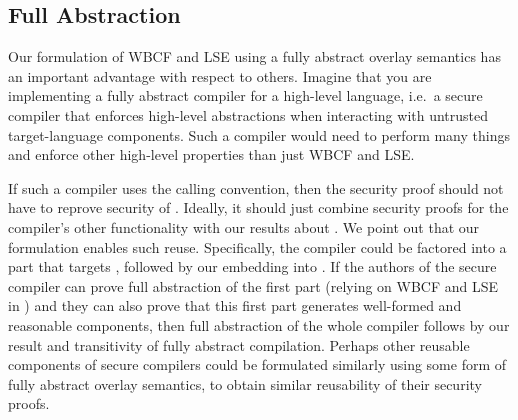 \subsection{Full Abstraction}
Our formulation of WBCF and LSE using a fully abstract overlay semantics has an important advantage with respect to others.
Imagine that you are implementing a fully abstract compiler for a high-level language, i.e.\ a secure compiler that enforces high-level abstractions when interacting with untrusted target-language components.
Such a compiler would need to perform many things and enforce other high-level properties than just WBCF and LSE.

If such a compiler uses the \stktokens{} calling convention, then the security proof should not have to reprove security of \stktokens{}.
Ideally, it should just combine security proofs for the compiler's other functionality with our results about \stktokens{}.
We point out that our formulation enables such reuse.
Specifically, the compiler could be factored into a part that targets \srccm{}, followed by our embedding into \trgcm{}.
If the authors of the secure compiler can prove full abstraction of the first part (relying on WBCF and LSE in \srccm{}) and they can also prove that this first part generates well-formed and reasonable components, then full abstraction of the whole compiler follows by our result and transitivity of fully abstract compilation.
Perhaps other reusable components of secure compilers could be formulated similarly using some form of fully abstract overlay semantics, to obtain similar reusability of their security proofs.




